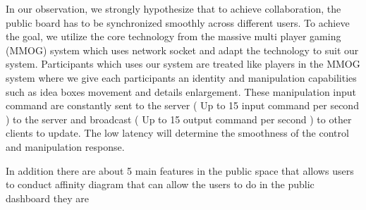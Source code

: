 \documentclass{sigchi}
\begin{document}
\begin{itemize}
In our observation, we strongly hypothesize that to achieve collaboration, the public board has to be synchronized smoothly across different users. To achieve the goal, we utilize the core technology from the massive multi player gaming (MMOG) system which uses network socket and adapt the technology to suit our system. Participants which uses our system are treated like players in the MMOG system where we give each participants an identity and manipulation capabilities such as idea boxes movement and details enlargement. These manipulation input command are constantly sent to the server ( Up to 15 input command per second )  to the server and broadcast ( Up to 15 output command per second ) to other clients to update.  The low latency will determine the smoothness of the control and manipulation response. 


In addition there are about 5 main features in the public space that allows users to conduct affinity diagram  that can allow the users to do in the public dashboard they are 

\begin{itemize}



\end{itemize}
\end{itemize}
\end{document}
